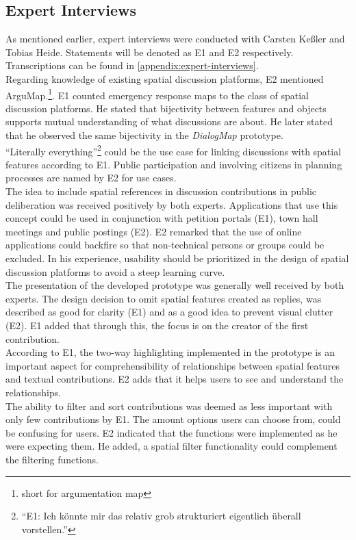 \subsection{Expert Interviews}
\label{sub:ev_expert_interviews}
As mentioned earlier, expert interviews were conducted with Carsten Ke{\ss}ler and Tobias Heide. Statements will be denoted as E1 and E2 respectively. Transcriptions can be found in \ref{appendix:expert-interviews}.\\
Regarding knowledge of existing spatial discussion platforms, E2 mentioned ArguMap.\footnote{short for argumentation map}. E1 counted emergency response maps to the class of spatial discussion platforms. He stated that bijectivity between features and objects supports mutual understanding of what discussions are about. He later stated that he observed the same bijectivity in the \textit{DialogMap} prototype.\\
``Literally everything''\footnote{``E1: Ich k{\"o}nnte mir das relativ grob strukturiert eigentlich {\"u}berall vorstellen.''} could be the use case for linking discussions with spatial features according to E1. Public participation and involving citizens in planning processes are named by E2 for use cases.\\
The idea to include spatial references in discussion contributions in public deliberation was received positively by both experts. Applications that use this concept could be used in conjunction with petition portals (E1), town hall meetings and public postings (E2). E2 remarked that the use of online applications could backfire so that non-technical persons or groups could be excluded. In his experience, usability should be prioritized in the design of spatial discussion platforms to avoid a steep learning curve.\\
The presentation of the developed prototype was generally well received by both experts. The design decision to omit spatial features created as replies, was described as good for clarity (E1) and as a good idea to prevent visual clutter (E2). E1 added that through this, the focus is on the creator of the first contribution.\\
According to E1, the two-way highlighting implemented in the prototype is an important aspect for comprehensibility of relationships between spatial features and textual contributions. E2 adds that it helps users to see and understand the relationships.\\
The ability to filter and sort contributions was deemed as less important with only few contributions by E1. The amount options users can choose from, could be confusing for users. E2 indicated that the functions were implemented as he were expecting them. He added, a spatial filter functionality could complement the filtering functions.\\
